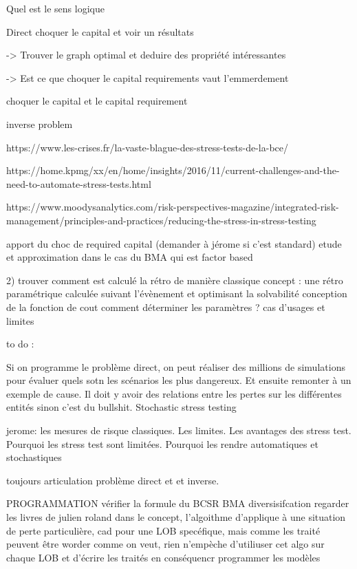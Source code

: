 
Quel est le sens logique

Direct
choquer le capital et voir un résultats

-> Trouver le graph optimal et deduire des propriété intéressantes


-> Est ce que choquer le capital requirements vaut l'emmerdement



choquer le capital et le capital requirement


inverse problem





https://www.les-crises.fr/la-vaste-blague-des-stress-tests-de-la-bce/

https://home.kpmg/xx/en/home/insights/2016/11/current-challenges-and-the-need-to-automate-stress-tests.html

https://www.moodysanalytics.com/risk-perspectives-magazine/integrated-risk-management/principles-and-practices/reducing-the-stress-in-stress-testing


apport du choc de required capital (demander à jérome si c'est standard)
etude et approximation dans le cas du BMA qui est factor based

2)
trouver comment est calculé la rétro de manière classique
concept : une rétro paramétrique calculée suivant l'évènement et optimisant la solvabilité
conception de la fonction de cout
comment déterminer les paramètres ?
cas d'usages et limites

to do :

Si on programme le problème direct, on peut réaliser des millions de simulations pour évaluer quels sotn les scénarios les plus dangereux. Et ensuite remonter à un exemple de cause. Il doit y avoir des relations entre les pertes sur les différentes entités sinon c'est du bullshit. Stochastic stress testing

jerome:
 les mesures de risque classiques. Les limites. Les avantages des stress test. Pourquoi les stress test sont limitées. Pourquoi les rendre automatiques et stochastiques
 
 toujours articulation problème direct et et inverse.

PROGRAMMATION
vérifier la formule du BCSR BMA diversisifcation
regarder les livres de julien roland
dans le concept, l'algoithme d'applique à une situation de perte particulière, cad pour une LOB specéfique, mais comme les traité peuvent être worder comme on veut, rien n'empèche d'utiliuser cet algo sur chaque LOB et d'écrire les traités en conséquencr
programmer les modèles

